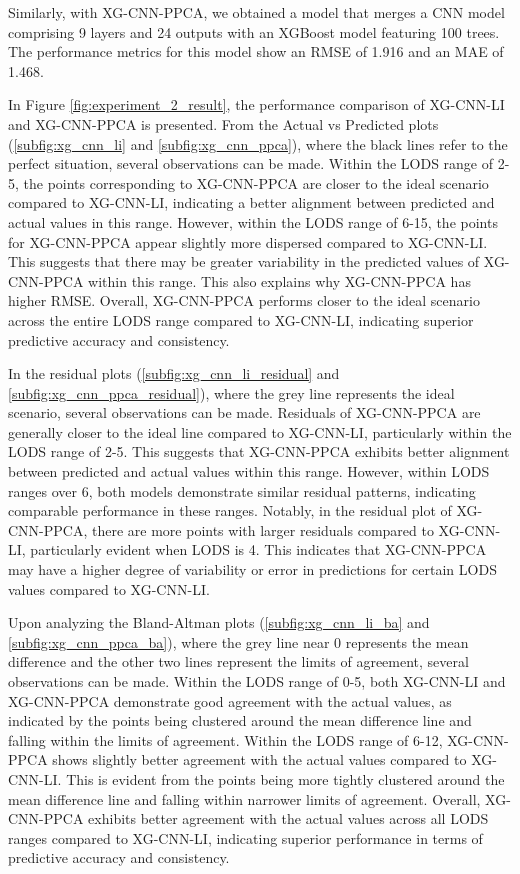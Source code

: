 \documentclass[12pt,a4paper,english
]{tunithesis}
\begin{document}
Similarly, with XG-CNN-PPCA, we obtained a model that merges a CNN model comprising 9 layers and 24 outputs with an XGBoost model featuring 100 trees. The performance metrics for this model show an RMSE of 1.916 and an MAE of 1.468.

In Figure \ref{fig:experiment_2_result}, the performance comparison of XG-CNN-LI and XG-CNN-PPCA is presented. From the Actual vs Predicted plots (\ref{subfig:xg_cnn_li} and \ref{subfig:xg_cnn_ppca}), where the black lines refer to the perfect situation, several observations can be made. Within the LODS range of 2-5, the points corresponding to XG-CNN-PPCA are closer to the ideal scenario compared to XG-CNN-LI, indicating a better alignment between predicted and actual values in this range. However, within the LODS range of 6-15, the points for XG-CNN-PPCA appear slightly more dispersed compared to XG-CNN-LI. This suggests that there may be greater variability in the predicted values of XG-CNN-PPCA within this range. This also explains why XG-CNN-PPCA has higher RMSE. Overall, XG-CNN-PPCA performs closer to the ideal scenario across the entire LODS range compared to XG-CNN-LI, indicating superior predictive accuracy and consistency.

In the residual plots (\ref{subfig:xg_cnn_li_residual} and \ref{subfig:xg_cnn_ppca_residual}), where the grey line represents the ideal scenario, several observations can be made. Residuals of XG-CNN-PPCA are generally closer to the ideal line compared to XG-CNN-LI, particularly within the LODS range of 2-5. This suggests that XG-CNN-PPCA exhibits better alignment between predicted and actual values within this range. However, within LODS ranges over 6, both models demonstrate similar residual patterns, indicating comparable performance in these ranges. Notably, in the residual plot of XG-CNN-PPCA, there are more points with larger residuals compared to XG-CNN-LI, particularly evident when LODS is 4. This indicates that XG-CNN-PPCA may have a higher degree of variability or error in predictions for certain LODS values compared to XG-CNN-LI.


Upon analyzing the Bland-Altman plots (\ref{subfig:xg_cnn_li_ba} and \ref{subfig:xg_cnn_ppca_ba}), where the grey line near 0 represents the mean difference and the other two lines represent the limits of agreement, several observations can be made. Within the LODS range of 0-5, both XG-CNN-LI and XG-CNN-PPCA demonstrate good agreement with the actual values, as indicated by the points being clustered around the mean difference line and falling within the limits of agreement. Within the LODS range of 6-12, XG-CNN-PPCA shows slightly better agreement with the actual values compared to XG-CNN-LI. This is evident from the points being more tightly clustered around the mean difference line and falling within narrower limits of agreement. Overall, XG-CNN-PPCA exhibits better agreement with the actual values across all LODS ranges compared to XG-CNN-LI, indicating superior performance in terms of predictive accuracy and consistency.
\end{document}
